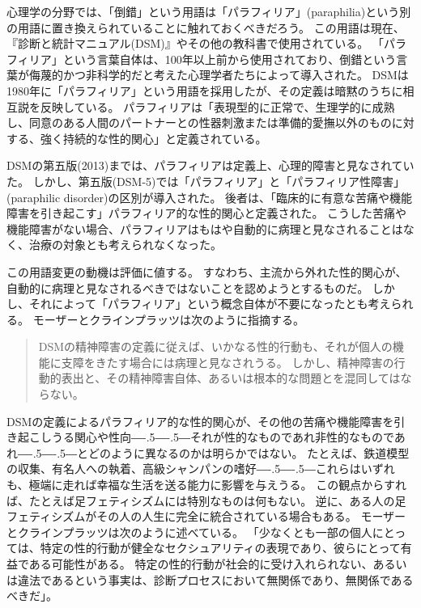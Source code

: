 \documentclass[paper=a4,book,openany]{jlreq}
\newcommand{\ig}[1]{}           %
\def\DDASH{―\kern-.5\zw―\kern-.5\zw―}
\begin{document}
心理学の分野では、「倒錯」という用語は「パラフィリア」(paraphilia)という別の用語に置き換えられていることに触れておくべきだろう。
この用語は現在、『診断と統計マニュアル(DSM)』\ig{診断と統計マニュアル}やその他の教科書で使用されている。
「パラフィリア」という言葉自体は、100年以上前から使用されており、倒錯という言葉が侮蔑的かつ非科学的だと考えた心理学者たちによって導入された。
DSMは1980年に「パラフィリア」という用語を採用したが、その定義は暗黙のうちに相互説を反映している。
パラフィリアは「表現型的に正常で、生理学的に成熟し、同意のある人間のパートナーとの性器刺激または準備的愛撫以外のものに対する、強く持続的な性的関心」と定義されている\citep[p. 685]{APA13:DSM}。

DSMの第五版(2013)までは、パラフィリアは定義上、心理的障害と見なされていた。
しかし、第五版(DSM-5)では「パラフィリア」と「パラフィリア性障害」(paraphilic disorder)の区別が導入された。
後者は、「臨床的に有意な苦痛や機能障害を引き起こす」パラフィリア的な性的関心と定義された\citep[p. 694]{APA13:DSM}\ig{診断と統計マニュアル}。
こうした苦痛や機能障害がない場合、パラフィリアはもはや自動的に病理と見なされることはなく、治療の対象とも考えられなくなった。

この用語変更の動機は評価に値する。
すなわち、主流から外れた性的関心が、自動的に病理と見なされるべきではないことを認めようとするものだ。
しかし、それによって「パラフィリア」という概念自体が不要になったとも考えられる。
モーザーとクラインプラッツは次のように指摘する。

\begin{quote}
  DSMの精神障害の定義に従えば、いかなる性的行動も、それが個人の機能に支障をきたす場合には病理と見なされうる。
しかし、精神障害の行動的表出と、その精神障害自体、あるいは根本的な問題とを混同してはならない。
\citep[p. 103]{moser05:_dsm_iv_tr_parap}\ig{診断と統計マニュアル}

\end{quote}

DSM\ig{診断と統計マニュアル}の定義によるパラフィリア的な性的関心が、その他の苦痛や機能障害を引き起こしうる関心や性向{\DDASH}それが性的なものであれ非性的なものであれ{\DDASH}とどのように異なるのかは明らかではない。
たとえば、鉄道模型の収集、有名人への執着、高級シャンパンの嗜好{\DDASH}これらはいずれも、極端に走れば幸福な生活を送る能力に影響を与えうる。
この観点からすれば、たとえば足フェティシズムには特別なものは何もない。
逆に、ある人の足フェティシズムがその人の人生に完全に統合されている場合もある。
モーザーとクラインプラッツは次のように述べている。
「少なくとも一部の個人にとっては、特定の性的行動が健全なセクシュアリティの表現であり、彼らにとって有益である可能性がある。
特定の性的行動が社会的に受け入れられない、あるいは違法であるという事実は、診断プロセスにおいて無関係であり、無関係であるべきだ」\citep[p.95]{moser05:_dsm_iv_tr_parap}。
\end{document}
